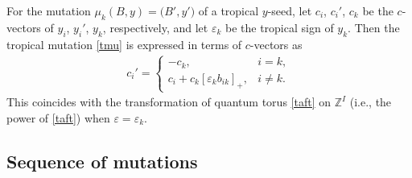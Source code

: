 \documentclass[pdftex]{sigma}
\newcommand{\Z}{{\mathbb Z}}
\def\ve{{\varepsilon}}
\numberwithin{equation}{section}
\begin{document}
\begin{Remark}\label{re:sgni}
For the mutation $\mu_k (B,y) = \bigl(B',y'\bigr)$ of a tropical $y$-seed,
let $c_i$, $c_i'$, $c_k$ be the $c$-vectors of $y_i$, $y_i'$, $y_k$, respectively,
and let $\ve_k$ be the tropical sign of $y_k$.
Then the tropical mutation \eqref{tmu} is expressed in terms of $c$-vectors as
\begin{align*}
 c_i' =
 \begin{cases}
 -c_k, & i=k,
 \\
 c_i + c_k [\ve_k b_{ik}]_+, & i \neq k.
\end{cases}
\end{align*}
This coincides with the transformation of quantum torus \eqref{taft}
on $\Z^I$ (i.e., the power of \eqref{taft}) when $\ve = \ve_k$.
\end{Remark}

\subsection{Sequence of mutations}
\end{document}
